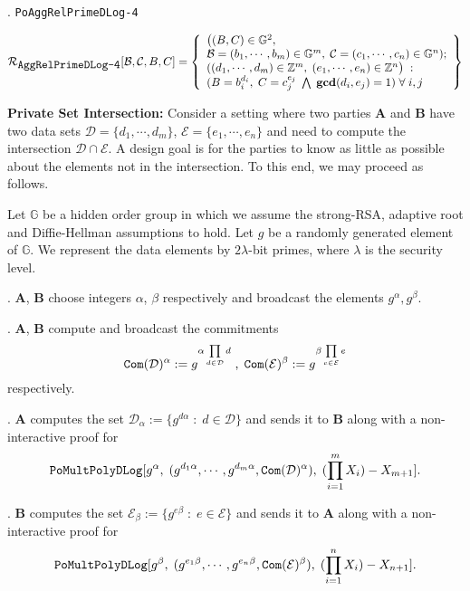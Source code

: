 \documentclass[11pt, lettersize, notitlepage, leqno, footskip=0.6cm]{article}
\newcommand{\bz}{\mathbb Z}
\newcommand{\pl}{\prod\limits}
\newcommand{\mc}{\mathcal}
\newcommand{\mb}{\mathbb}
\newcommand{\mbf}{\mathbf}
\newcommand{\al}{\alpha}
\newcommand{\be}{\beta}
\newcommand{\lam}{\lambda}
\newcommand{\vs}{\vspace{-0.15cm}}
\newcommand{\noin}{\noindent}
\newcommand{\GCD}{\mbf{gcd}}
\numberwithin{equation}{section}
\begin{document}
{\noin 13. \verb|PoAggRelPrimeDLog-4| \vspace{-0.7cm}

\[
  \mc{R}_{{\protect\verb|AggRelPrimeDLog-4|}}[\mc{B}, \mc{C}, B, C] = \left\{\begin{array}{l}
    \big((B,C)\in\mb{G}^2,\;\\
     \mc{B} = (b_1,\cdots,b_m)\in\mb{G}^m,\;\mc{C} = (c_1,\cdots, c_n)\in\mb{G}^n);\\
    ((d_1,\cdots,d_m)\in\bz^m,\; (e_1,\cdots,e_n)\in\bz^n\big)\;: \\
    (B = b_i^{d_i},\; C = c_j^{e_j}\;\bigwedge \; \GCD(d_i, e_j) = 1)\;\forall \;i,j
  \end{array}\right\}
\] 


\bigskip

\newpage


\noin \textbf{Private Set Intersection:} Consider a setting where two parties $\mbf{A}$ and $\mbf{B}$ have two data sets $\mc{D} = \{d_1,\cdots,d_m \}$, $\mc{E} = \{e_1,\cdots,e_n \}$ and need to compute the intersection $\mc{D}\cap \mc{E}$. A design goal is for the parties to know as little as possible about the elements not in the intersection. To this end, we may proceed as follows. 

Let $\mb{G}$ be a hidden order group in which we assume the strong-RSA, adaptive root and Diffie-Hellman assumptions to hold. Let $g$ be a randomly generated element of $\mb{G}$. We represent the data elements by $2\lam$-bit primes, where $\lam$ is the security level. \vspace{0.15cm}

\noin 1. $\mbf{A}$, $\mbf{B}$ choose integers $\al$, $\be$ respectively and broadcast the elements $g^{\al}, g^{\be}$.

\noin 2.  $\mbf{A}$, $\mbf{B}$ compute and broadcast the commitments \vs $$\protect{\verb|Com|}(\mc{D})^{\al}:= g^{\al\pl_{d\in\mc{D}} d }\;,\; \protect{\verb|Com|}(\mc{E})^{\be}:=  g^{\be\pl_{e\in\mc{E}} e } $$ respectively. 

\noin 3. $\mbf{A}$ computes the set $\mc{D}_{\al} := \{g^{ d\al}\;:\; d\in\mc{D}\}$ and sends it to $\mbf{B}$ along with a non-interactive proof for \vs $$\protect{\verb|PoMultPolyDLog|}[g^{\al},\;(g^{d_1\al},\cdots, g^{d_m\al},\protect{\verb|Com|}(\mc{D})^{\al}),\; (\pl_{i=1}^m X_i)-X_{m+1}].$$ 

\noin 4. $\mbf{B}$ computes the set $\mc{E}_{\be}:= \{g^{ e\be}\;:\; e\in\mc{E}\}$ and sends it to $\mbf{A}$ along with a non-interactive proof for \vs $$\protect{\verb|PoMultPolyDLog|}[g^{\be},\;(g^{e_1\be},\cdots, g^{e_n\be},\protect{\verb|Com|}(\mc{E})^{\be}),\; (\pl_{i=1}^n X_i)-X_{n+1}].$$

}
\end{document}
